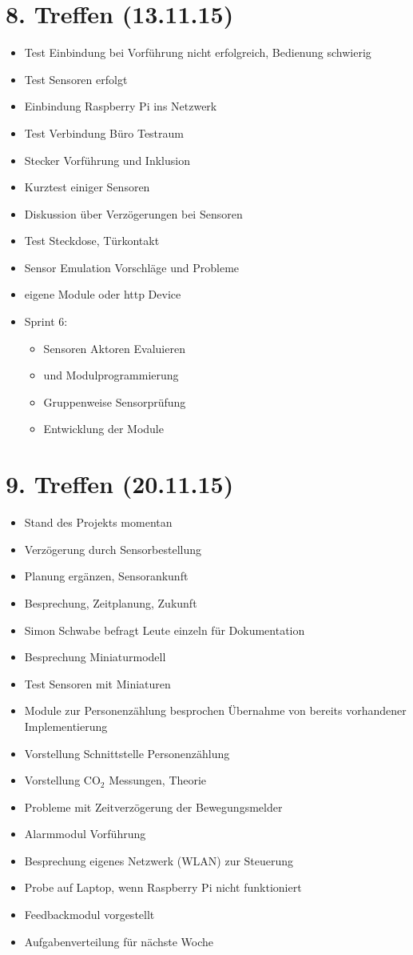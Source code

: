 \section{8. Treffen (13.11.15)}
\begin{itemize}
	\item Test Einbindung bei Vorführung nicht erfolgreich, Bedienung schwierig
	\item Test Sensoren erfolgt
	\item Einbindung Raspberry Pi ins Netzwerk
	\item Test Verbindung Büro Testraum
	\item Stecker Vorführung und Inklusion
	\item Kurztest einiger Sensoren
	\item Diskussion über Verzögerungen bei Sensoren
	\item Test Steckdose, Türkontakt
	\item Sensor Emulation Vorschläge und Probleme
	\item eigene Module oder http Device
	\item Sprint 6:
	\begin{itemize}
			\item Sensoren Aktoren Evaluieren
			\item und Modulprogrammierung
			\item Gruppenweise Sensorprüfung
			\item Entwicklung der Module
	\end{itemize}	
\end{itemize}

\section{9. Treffen (20.11.15)}
\begin{itemize}
	\item Stand des Projekts momentan
	\item Verzögerung durch Sensorbestellung
	\item Planung ergänzen, Sensorankunft
	\item Besprechung, Zeitplanung, Zukunft
	\item Simon Schwabe befragt Leute einzeln für Dokumentation
	\item Besprechung Miniaturmodell
	\item Test Sensoren mit Miniaturen
	\item Module zur Personenzählung besprochen Übernahme von bereits vorhandener Implementierung
	\item Vorstellung Schnittstelle Personenzählung
	\item Vorstellung CO$_2$ Messungen, Theorie
	\item Probleme mit Zeitverzögerung der Bewegungsmelder
	\item Alarmmodul Vorführung
	\item Besprechung eigenes Netzwerk (WLAN) zur Steuerung
	\item Probe auf Laptop, wenn Raspberry Pi nicht funktioniert
	\item Feedbackmodul vorgestellt
	\item Aufgabenverteilung für nächste Woche
\end{itemize}


